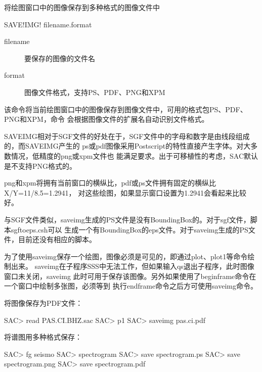 \label{cmd:saveimg}

将绘图窗口中的图像保存到多种格式的图像文件中

\begin{SACSTX}
SAVE!IMG! filename.format
\end{SACSTX}

\begin{description}
\item [filename] 要保存的图像的文件名
\item [format] 图像文件格式，支持PS、PDF、PNG和XPM
\end{description}

该命令将当前绘图窗口中的图像保存到图像文件中，可用的格式包PS、PDF、PNG和XPM，命令
会根据图像文件的扩展名自动识别文件格式。

SAVEIMG相对于SGF文件的好处在于，SGF文件中的字母和数字是由线段组成的，而SAVEIMG产生的
ps或pdf图像采用Postscript的特性直接产生字体。对大多数情况，低精度的png或xpm文件也
能满足要求。出于可移植性的考虑，SAC默认是不支持PNG格式的。

png和xpm将拥有当前窗口的横纵比，pdf或ps文件拥有固定的横纵比X/Y=11/8.5=1.2941，
对这些绘图，如果显示窗口设置为1.2941会看起来比较好。

与SGF文件类似，saveimg生成的PS文件是没有BoundingBox的。对于sgf文件，脚本sgftoeps.csh可以
生成一个有BoundingBox的eps文件。对于saveimg生成的PS文件，目前还没有相应的脚本。

为了使用saveimg保存一个绘图，图像必须是可见的，即通过plot、plot1等命令绘制出来。
saveimg在子程序SSS中无法工作，但如果输入qs退出子程序，此时图像窗口未关闭，saveimg
此时可用于保存该图像。另外如果使用了beginframe命令在一个窗口中绘制多张图，必须等到
执行endframe命令之后方可使用saveimg命令。

将图像保存为PDF文件：
\begin{SACCode}
SAC> read PAS.CI.BHZ.sac
SAC> p1
SAC> saveimg pas.ci.pdf
\end{SACCode}

将谱图用多种格式保存：
\begin{SACCode}
SAC> fg seismo
SAC> spectrogram
SAC> save spectrogram.ps
SAC> save spectrogram.png
SAC> save spectrogram.pdf
\end{SACCode}
